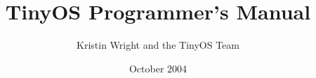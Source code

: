 \documentclass[10pt]{article}
\begin{document}
  
\title{TinyOS Programmer's Manual}
\author{Kristin Wright and the TinyOS Team}
\date{October 2004}

\maketitle



%

%
%

%
%
%




\end{document}
